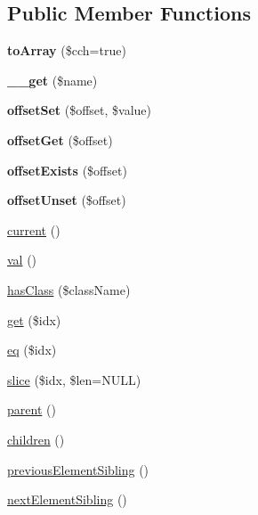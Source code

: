 \subsection*{Public Member Functions}
\begin{DoxyCompactItemize}
\item 
\mbox{\label{classduzun_1_1hQuery_1_1Element_a70cdd6880a13b65547ae89fedabc3686}} 
{\bfseries to\+Array} (\$cch=true)
\item 
\mbox{\label{classduzun_1_1hQuery_1_1Element_a8480ff8371f157ce25a059b3c5ce5141}} 
{\bfseries \+\_\+\+\_\+get} (\$name)
\item 
\mbox{\label{classduzun_1_1hQuery_1_1Element_a9ad3dff6d3a73beb78cd718c7cfc302c}} 
{\bfseries offset\+Set} (\$offset, \$value)
\item 
\mbox{\label{classduzun_1_1hQuery_1_1Element_aa4b03dbfae9b31f2c236c3ed958c9f7e}} 
{\bfseries offset\+Get} (\$offset)
\item 
\mbox{\label{classduzun_1_1hQuery_1_1Element_af681724466bfb37db382872d88f970d4}} 
{\bfseries offset\+Exists} (\$offset)
\item 
\mbox{\label{classduzun_1_1hQuery_1_1Element_a201fa1e4b296059b4597bc0673ba2e50}} 
{\bfseries offset\+Unset} (\$offset)
\item 
\mbox{\hyperlink{classduzun_1_1hQuery_1_1Element_abef85d8c18394f2c2c1fc25a4f439b55}{current}} ()
\item 
\mbox{\hyperlink{classduzun_1_1hQuery_1_1Element_a0ec6920ccb04c246df8490afeb89baf4}{val}} ()
\item 
\mbox{\hyperlink{classduzun_1_1hQuery_1_1Element_a0791de5ec50b8d91dacca06ee2074364}{has\+Class}} (\$class\+Name)
\item 
\mbox{\hyperlink{classduzun_1_1hQuery_1_1Element_aa629dd31a0d9ced799f65e4bd7c0b0f3}{get}} (\$idx)
\item 
\mbox{\hyperlink{classduzun_1_1hQuery_1_1Element_a2d857e83bcbd0d8de4c263b0afc64f43}{eq}} (\$idx)
\item 
\mbox{\hyperlink{classduzun_1_1hQuery_1_1Element_a172b277ee653f07905288411d20f42e5}{slice}} (\$idx, \$len=N\+U\+LL)
\item 
\mbox{\hyperlink{classduzun_1_1hQuery_1_1Element_a7a475b43ddf3e33b0d4fbc419d70369a}{parent}} ()
\item 
\mbox{\hyperlink{classduzun_1_1hQuery_1_1Element_ab19b0b422c54a00c0165543b5020253c}{children}} ()
\item 
\mbox{\hyperlink{classduzun_1_1hQuery_1_1Element_a189315f6240a6a76be142604c8258b27}{previous\+Element\+Sibling}} ()
\item 
\mbox{\hyperlink{classduzun_1_1hQuery_1_1Element_aae1431b6dd85e2289ce1b86ba9c9b4c5}{next\+Element\+Sibling}} ()
\end{DoxyCompactItemize}
